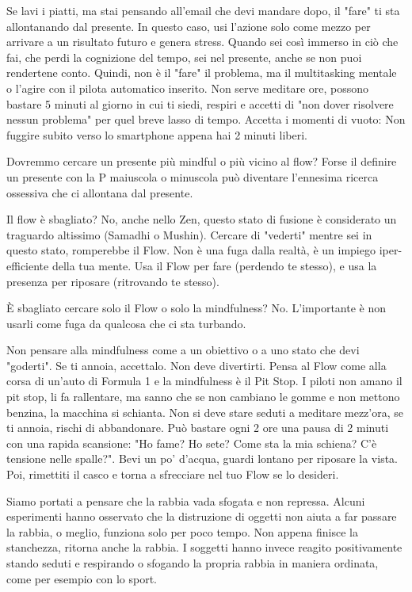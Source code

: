\documentclass[12pt]{book} %
\begin{document}
Se lavi i piatti, ma stai pensando all'email che devi mandare dopo, il "fare" ti sta allontanando dal presente. In questo caso, usi l'azione solo come mezzo per arrivare a un risultato futuro e genera stress. Quando sei così immerso in ciò che fai, che perdi la cognizione del tempo, sei nel presente, anche se non puoi rendertene conto. Quindi, non è il "fare" il problema, ma il multitasking mentale o l'agire con il pilota automatico inserito. Non serve meditare ore, possono bastare 5 minuti al giorno in cui ti siedi, respiri e accetti di "non dover risolvere nessun problema" per quel breve lasso di tempo. 
Accetta i momenti di vuoto: Non fuggire subito verso lo smartphone appena hai 2 minuti liberi.

Dovremmo cercare un presente più mindful o più vicino al flow?
Forse il definire un presente con la P maiuscola o minuscola può diventare l'ennesima ricerca ossessiva che ci allontana dal presente.

Il flow è sbagliato? No, anche nello Zen, questo stato di fusione è considerato un traguardo altissimo (Samadhi o Mushin).
Cercare di "vederti" mentre sei in questo stato, romperebbe il Flow. Non è una fuga dalla realtà, è un impiego iper-efficiente della tua mente. 
Usa il Flow per fare (perdendo te stesso), e usa la presenza per riposare (ritrovando te stesso).

È sbagliato cercare solo il Flow o solo la mindfulness? No.
L'importante è non usarli come fuga da qualcosa che ci sta turbando.

Non pensare alla mindfulness come a un obiettivo o a uno stato che devi "goderti". Se ti annoia, accettalo. Non deve divertirti.
Pensa al Flow come alla corsa di un'auto di Formula 1 e la mindfulness è il Pit Stop.
I piloti non amano il pit stop, li fa rallentare, ma sanno che se non cambiano le gomme e non mettono benzina, la macchina si schianta.
Non si deve stare seduti a meditare mezz'ora, se ti annoia, rischi di abbandonare. Può bastare ogni 2 ore una pausa di 2 minuti con una rapida scansione: "Ho fame? Ho sete? Come sta la mia schiena? C'è tensione nelle spalle?".
Bevi un po' d'acqua, guardi lontano per riposare la vista.
Poi, rimettiti il casco e torna a sfrecciare nel tuo Flow se lo desideri.

\begin{mdframed}[linewidth=1pt]
Siamo portati a pensare che la rabbia vada sfogata e non repressa. Alcuni esperimenti hanno osservato che la distruzione di oggetti non aiuta a far passare la rabbia, o meglio, funziona solo per poco tempo. Non appena finisce la stanchezza, ritorna anche la rabbia. I soggetti hanno invece reagito positivamente stando seduti e respirando o sfogando la propria rabbia in maniera ordinata, come per esempio con lo sport.
\end{mdframed}
\end{document}
